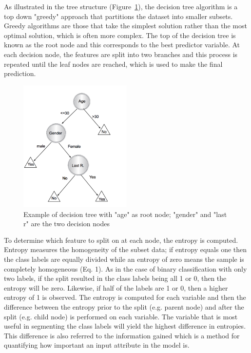 \documentclass{llncs}
\begin{document}
As illustrated in the tree structure (Figure~\ref{fig:tree}), the decision tree algorithm is a top down "greedy" approach that partitions the dataset into smaller subsets. Greedy algorithms are those that take the simplest solution rather than the most optimal solution, which is often more complex. The top of the decision tree is known as the root node and this corresponds to the best predictor variable. At each decision node, the features are split into two branches and this process is repeated until the leaf nodes are reached, which is used to make the final prediction.

\begin{figure}
\centering
\includegraphics[width=0.5\textwidth]{decisiontree.png}
\caption{Example of decision tree with "age" as root node; "gender" and "last r" are the two decision nodes \cite{lior}}
\label{fig:tree}
\end{figure}

To determine which feature to split on at each node, the entropy is computed. Entropy measures the homogeneity of the subset data; if entropy equals one then the class labels are equally divided while an entropy of zero means the sample is completely homogeneous (Eq. 1). As in the case of binary classification with only two labels, if the split resulted in the class labels being all 1 or 0, then the entropy will be zero. Likewise, if half of the labels are 1 or 0, then a higher entropy of 1 is observed. The entropy is computed for each variable and then the difference between the entropy prior to the split (e.g. parent node) and after the split (e.g. child node) is performed on each variable. The variable that is most useful in segmenting the class labels will yield the highest difference in entropies. This difference is also referred to the information gained which is a method for quantifying how important an input attribute in the model is. 
\end{document}
